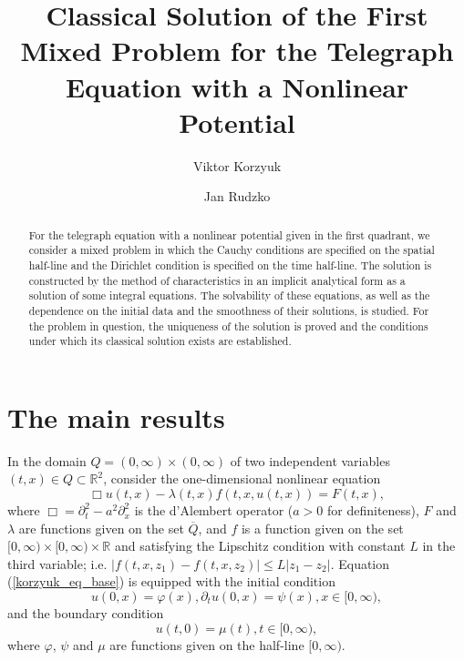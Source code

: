 \documentclass[12pt]{llncs}
\begin{document}
\fi

\title{Classical Solution of the First Mixed Problem for the Telegraph Equation with a Nonlinear Potential}
\author{Viktor Korzyuk
  \and
  Jan Rudzko
}

\maketitle

\begin{abstract}
For the telegraph equation with a nonlinear potential given in the first quadrant, we consider a mixed problem in which the Cauchy conditions are specified on the spatial half-line and the Dirichlet condition is specified on the time half-line. The solution is constructed by the method of characteristics in an implicit analytical form as a solution of some integral equations. The solvability of these equations, as well as the dependence on the initial data and the smoothness of their solutions, is studied. For the problem in question, the uniqueness of the
solution is proved and the conditions under which its classical solution exists are established.
\end{abstract}

\section{The main results}
In the domain $Q=(0, \infty) \times (0, \infty)$ of two independent variables $(t,x) \in Q \subset \mathbb{R}^2$, consider the one-dimensional nonlinear equation
\begin{equation}\label{korzyuk_eq_base}
    \Box u(t,x) - \lambda(t, x) f(t, x, u(t, x)) = F(t,x),
\end{equation}
where $\Box = \partial_t^2 - a^2 \partial_x^2$ is the d’Alembert operator ($a > 0$ for definiteness), $F$ and $\lambda$ are functions given on the set $\overline{Q}$, and $f$ is a function given on the set $[0, \infty) \times [0, \infty) \times \mathbb{R}$ and satisfying the Lipschitz condition with constant $L$ in the third variable; i.e. $|f(t,x,z_1) - f(t,x,z_2)| \leq L |z_1 - z_2|$. Equation (\ref{korzyuk_eq_base}) is equipped with the initial condition
\begin{equation}\label{korzyuk_cauchy_base}
    u(0, x) = \varphi(x), \partial_t u(0, x) = \psi(x), x \in [0, \infty),
\end{equation}
and the boundary condition
\begin{equation}\label{korzyuk_gran_base}
    u(t, 0) = \mu(t), t \in [0, \infty),
\end{equation}
where $\varphi$, $\psi$ and $\mu$ are functions given on the half-line $[0, \infty)$.
\end{document}
